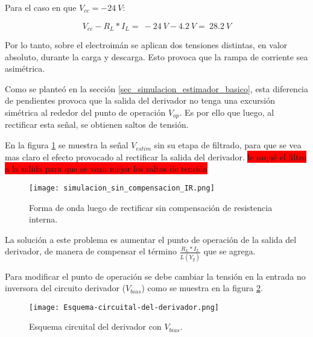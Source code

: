 Para el caso en que $V_{cc}=-24\:V$:

\begin{equation} \label{eq_Vbus-didt-RL-4}
	V_{cc}-R_L*I_L=\ -24\:V-4.2\:V=\ 28.2\:V
\end{equation}

Por lo tanto, sobre el electroimán se aplican dos tensiones distintas, en valor absoluto, durante la carga y descarga. Esto provoca que la rampa de corriente sea asimétrica.

Como se planteó en la sección \ref{sec_simulacion_estimador_basico}, esta diferencia de pendientes provoca que la salida del derivador no tenga una excursión simétrica al rededor del punto de operación $V_{op}$. Es por ello que luego, al rectificar esta señal, se obtienen saltos de tensión.

En la figura \ref{fig:img_simulacion_sin_compensacion_IR} se muestra la señal $V_{estim}$ sin su etapa de filtrado, para que se vea mas claro el efecto provocado al rectificar la salida del derivador. 
\colorbox{red}{le saqué el filtro a la salida para que se vean mejor los saltos de tensión}


\begin{figure}[H]
	\centering
	\texttt{[image: simulacion\_sin\_compensacion\_IR.png]}
	\caption{Forma de onda luego de rectificar sin compensación de resistencia interna.}
	\label{fig:img_simulacion_sin_compensacion_IR}
\end{figure}

La solución a este problema es aumentar el punto de operación de la salida del derivador, de manera de compensar el término $\frac{R_L*I_L}{L(Y_g)}$ que se agrega.

Para modificar el punto de operación se debe cambiar la tensión en la entrada no inversora del circuito derivador ($V_{bias}$) como se muestra en la figura \ref{fig:img_Esquema-circuital-del-derivador}. 

\begin{figure}[H]
	\centering
	\texttt{[image: Esquema-circuital-del-derivador.png]}
	\caption{Esquema circuital del derivador con $V_{bias}$.}
	\label{fig:img_Esquema-circuital-del-derivador}
\end{figure}

